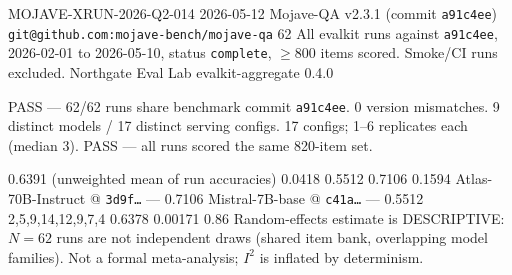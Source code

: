 
        {MOJAVE-XRUN-2026-Q2-014}
       {2026-05-12}
    {Mojave-QA}
 {v2.3.1 \textnormal{(commit }\texttt{a91c4ee}\textnormal{)}}
  {\texttt{git@github.com:mojave-bench/mojave-qa}}
            {62}
     {All evalkit runs against \texttt{a91c4ee},
                           2026-02-01 to 2026-05-10, status \texttt{complete},
                           $\ge 800$ items scored. Smoke/CI runs excluded.}
    {Northgate Eval Lab}
   {evalkit-aggregate 0.4.0}

     {PASS --- 62/62 runs share benchmark commit
                           \texttt{a91c4ee}. 0 version mismatches.}
     {9 distinct models / 17 distinct serving configs.}
 {17 configs; 1--6 replicates each (median 3).}
    {PASS --- all runs scored the same 820-item set.}

        {0.6391 \textnormal{(unweighted mean of run accuracies)}}
            {0.0418}
           {0.5512}
           {0.7106}
         {0.1594}
          {Atlas-70B-Instruct @ \texttt{3d9f\dots} --- 0.7106}
         {Mistral-7B-base @ \texttt{c41a\dots} --- 0.5512}
          {2,5,9,14,12,9,7,4}
       {0.6378}
         {0.00171}
           {0.86}
       {Random-effects estimate is DESCRIPTIVE: $N{=}62$
                           runs are not independent draws (shared item bank,
                           overlapping model families). Not a formal
                           meta-analysis; $I^2$ is inflated by determinism.}

